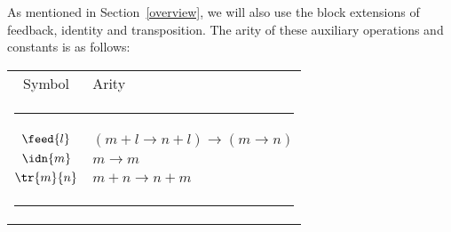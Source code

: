 \documentclass[fleqn]{llncs}
\begin{document}
As mentioned in Section~\ref{overview}, we will also use the block
extensions of feedback, identity and transposition.
The arity of these auxiliary operations and constants is as follows:
\begin{center}
\footnotesize
\begin{tabular}{c@{\quad}l}
Symbol & Arity \\[-1.25ex]
\multicolumn{2}{l}{\rule{.99\textwidth}{.125mm}} \svsp \\
$\feed{l}$  & $(m+l \to n+l) \to (m \to n)$ \\
$\idn{m}$   & $m \to m$                     \\
$\tr{m}{n}$ & $m+n \to n+m$                 \\
\multicolumn{2}{l}{\rule{.99\textwidth}{.125mm}} \\
\end{tabular}
\end{center}
\end{document}
